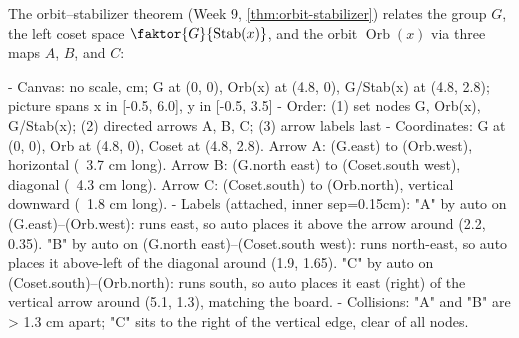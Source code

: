 \begin{content}
The orbit--stabilizer theorem (Week 9, \cref{thm:orbit-stabilizer}) relates the group $G$, the left coset space $\faktor{G}{\operatorname{Stab}(x)}$, and the orbit $\operatorname{Orb}(x)$ via three maps $A$, $B$, and $C$:

\begin{hidden}
- Canvas: no scale, cm; G at (0, 0), Orb(x) at (4.8, 0), G/Stab(x) at (4.8, 2.8); picture spans x in [-0.5, 6.0], y in [-0.5, 3.5]
- Order: (1) set nodes G, Orb(x), G/Stab(x); (2) directed arrows A, B, C; (3) arrow labels last
- Coordinates:
  G at (0, 0), Orb at (4.8, 0), Coset at (4.8, 2.8).
  Arrow A: (G.east) to (Orb.west), horizontal (~3.7 cm long).
  Arrow B: (G.north east) to (Coset.south west), diagonal (~4.3 cm long).
  Arrow C: (Coset.south) to (Orb.north), vertical downward (~1.8 cm long).
- Labels (attached, inner sep=0.15cm):
  "A" by auto on (G.east)--(Orb.west): runs east, so auto places it above the arrow around (2.2, 0.35).
  "B" by auto on (G.north east)--(Coset.south west): runs north-east, so auto places it above-left of the diagonal around (1.9, 1.65).
  "C" by auto on (Coset.south)--(Orb.north): runs south, so auto places it east (right) of the vertical arrow around (5.1, 1.3), matching the board.
- Collisions: "A" and "B" are > 1.3 cm apart; "C" sits to the right of the vertical edge, clear of all nodes.
\end{hidden}
\begin{center}
\end{center}


\end{content}
